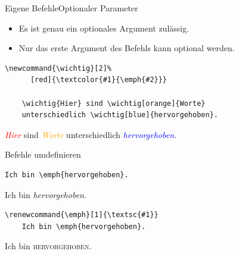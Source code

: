 \begin{Frame}[fragile]{Eigene Befehle}{Optionaler Parameter}
  \begin{itemize}
    \item Es ist \alert{genau ein} optionales Argument zulässig.
    \item Nur das \alert{erste Argument} des Befehls kann optional werden.
  \end{itemize}

  \xxx

  \begin{lstlisting}[gobble=4,moretexcs={wichtig}]
    \newcommand{\wichtig}[2]%
      [red]{\textcolor{#1}{\emph{#2}}}

    \wichtig{Hier} sind \wichtig[orange]{Worte}
    unterschiedlich \wichtig[blue]{hervorgehoben}.
  \end{lstlisting}
  \newcommand{\wichtig}[2]%
    [red]{\textcolor{#1}{\emph{#2}}}
  \wichtig{Hier} sind \wichtig[orange]{Worte}
  unterschiedlich \wichtig[blue]{hervorgehoben}.
\end{Frame}

\begin{Frame}[fragile]{Befehle umdefinieren}
  \begin{lstlisting}[gobble=4]
    Ich bin \emph{hervorgehoben}.
  \end{lstlisting}
  Ich bin \emph{hervorgehoben}.

  \xxx

  \begin{lstlisting}[gobble=4]
    \renewcommand{\emph}[1]{\textsc{#1}}
    Ich bin \emph{hervorgehoben}.
  \end{lstlisting}
  \renewcommand{\emph}[1]{\textsc{#1}}
  Ich bin \emph{hervorgehoben}.
\end{Frame}

